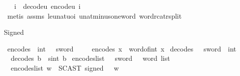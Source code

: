 \begin{isabellebody}
\ \ \ {\isachardoublequoteopen}i\ {\isacharequal}{\kern0pt}\ decode{\isacharunderscore}{\kern0pt}u{}{}\ {\isacharparenleft}{\kern0pt}encode{\isacharunderscore}{\kern0pt}u{}{}\ i{\isacharparenright}{\kern0pt}{\isachardoublequoteclose}\ \isanewline
%
\isadelimproof
\ \ %
\endisadelimproof
%
\isatagproof
{}\isamarkupfalse%
\ {\isacharparenleft}{\kern0pt}metis\ assms\ le{\isacharunderscore}{\kern0pt}unat{\isacharunderscore}{\kern0pt}uoi\ unat{\isacharunderscore}{\kern0pt}minus{\isacharunderscore}{\kern0pt}one{\isacharunderscore}{\kern0pt}word\ word{\isacharunderscore}{\kern0pt}rcat{\isacharunderscore}{\kern0pt}rsplit{\isacharparenright}{\kern0pt}%
\endisatagproof
{\isafoldproof}%
%
\isadelimproof
%
\endisadelimproof
%
\begin{isamarkuptext}%
Signed%
\end{isamarkuptext}\isamarkuptrue%
\isamarkupfalse%
\ encode{\isacharunderscore}{\kern0pt}s{}\ {\isacharcolon}{\kern0pt}{\isacharcolon}{\kern0pt}\ {\isachardoublequoteopen}int\ {\isasymRightarrow}\ {}\ sword{\isachardoublequoteclose}\isanewline
\ \ \isanewline
\ \ {\isachardoublequoteopen}encode{\isacharunderscore}{\kern0pt}s{}\ x\ {\isasymequiv}\ word{\isacharunderscore}{\kern0pt}of{\isacharunderscore}{\kern0pt}int\ x{\isachardoublequoteclose}\isanewline
\isanewline
{}\isamarkupfalse%
\ decode{\isacharunderscore}{\kern0pt}s{}\ {\isacharcolon}{\kern0pt}{\isacharcolon}{\kern0pt}\ {\isachardoublequoteopen}{}\ sword\ {\isasymRightarrow}\ int{\isachardoublequoteclose}\isanewline
\ \ \isanewline
\ \ {\isachardoublequoteopen}decode{\isacharunderscore}{\kern0pt}s{}\ b\ {\isasymequiv}\ sint\ b{\isachardoublequoteclose}\isanewline
\isanewline
{}\isamarkupfalse%
\ encode{\isacharunderscore}{\kern0pt}s{}{\isacharunderscore}{\kern0pt}list\ {\isacharcolon}{\kern0pt}{\isacharcolon}{\kern0pt}\ {\isachardoublequoteopen}{}\ sword\ {\isasymRightarrow}\ {}\ word\ list{\isachardoublequoteclose}\isanewline
\ \ \isanewline
\ \ {\isachardoublequoteopen}encode{\isacharunderscore}{\kern0pt}s{}{\isacharunderscore}{\kern0pt}list\ w\ {\isasymequiv}\ {\isacharbrackleft}{\kern0pt}SCAST{\isacharparenleft}{\kern0pt}{}\ signed\ {\isasymrightarrow}\ {}{\isacharparenright}{\kern0pt}\ w{\isacharbrackright}{\kern0pt}{\isachardoublequoteclose}\isanewline

\end{isabellebody}
